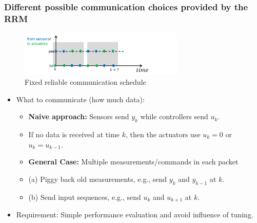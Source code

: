 \documentclass{beamer}
\begin{document}
\begin{frame}
\frametitle{Different possible communication choices provided by the RRM}
\vspace*{-.3in}
\begin{figure}
\centering
\includegraphics[width=0.7\textwidth, height = .25\textheight]{timing.png}
 \caption{{\footnotesize Fixed reliable communication schedule}} 
\end{figure}
\vspace*{-.3in}
\begin{itemize}
 \item What to communicate (how much data):
 \begin{itemize}
  \item \textbf{Naive approach:} Sensors send $y_k$ while controllers send $u_k$.
  \item[] If no data is received at time $k$, then the actuators use $u_k = 0$ or $u_k = u_{k-1}$.
 \end{itemize}
  \begin{itemize}
   \item \textbf{General Case:} Multiple measurements/commands in each packet
   \item[] (a) Piggy back old measurements, e.g., send $y_k$ and $y_{k-1}$ at $k$.
   \item[] (b) Send input sequences, e.g., send $u_{k}$ and $u_{k+1}$ at $k$.
  \end{itemize}
  \item Requirement: Simple performance evaluation and avoid influence of tuning.
\end{itemize}
\end{frame}
\end{document}
